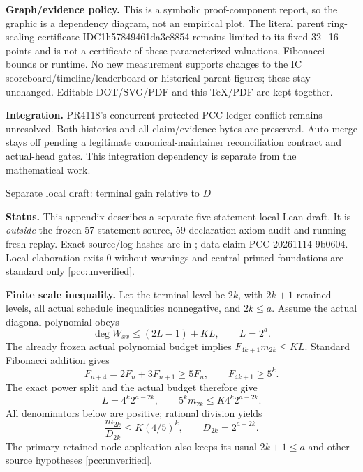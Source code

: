 \documentclass[10pt]{article}
\begin{document}
\textbf{Graph/evidence policy.} This is a symbolic proof-component report,
so the graphic is a dependency diagram, not an empirical plot. The literal
parent ring-scaling certificate IDC1h57849461da3c8854 remains limited to its
fixed 32+16 points and is not a certificate of these parameterized valuations,
Fibonacci bounds or runtime. No new measurement supports changes to the
IC scoreboard/timeline/leaderboard or historical parent figures; these stay
unchanged. Editable DOT/SVG/PDF and this TeX/PDF are kept together.

\textbf{Integration.} PR4118's concurrent protected PCC ledger conflict
remains unresolved. Both histories and all claim/evidence bytes are
preserved. Auto-merge stays off pending a legitimate canonical-maintainer
reconciliation contract and actual-head gates. This integration dependency
is separate from the mathematical work.
\newpage
\begin{center}{\Large Separate local draft: terminal gain relative to $D$}\end{center}
\textbf{Status.} This appendix describes a separate five-statement local
Lean draft. It is \emph{outside} the frozen 57-statement source, 59-declaration
axiom audit and running fresh replay. Exact source/log hashes are in
; data claim
PCC-20261114-9b0604. Local elaboration exits 0 without warnings and central
printed foundations are standard only [pcc:unverified].

\textbf{Finite scale inequality.} Let the terminal level be $2k$, with
$2k+1$ retained levels, all actual schedule inequalities nonnegative, and
$2k\le a$. Assume the actual diagonal polynomial obeys
\[
 \deg W_{xx}\le (2L-1)+KL,\qquad L=2^a.
\]
The already frozen actual polynomial budget implies
$F_{4k+1}m_{2k}\le KL$. Standard Fibonacci addition gives
\[
 F_{n+4}=2F_n+3F_{n+1}\ge5F_n,
 \qquad F_{4k+1}\ge5^k.
\]
The exact power split and the actual budget therefore give
\[
 L=4^k2^{a-2k},\qquad 5^km_{2k}\le K4^k2^{a-2k}.
\]
All denominators below are positive; rational division yields
\[
 \boxed{\frac{m_{2k}}{D_{2k}}\le K(4/5)^k},\qquad D_{2k}=2^{a-2k}.
\]
The primary retained-node application also keeps its usual $2k+1\le a$
and other source hypotheses [pcc:unverified].
\end{document}
